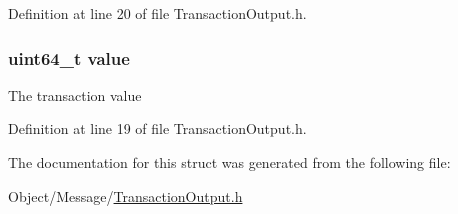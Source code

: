 Definition at line 20 of file TransactionOutput.h.

\hypertarget{struct_m_i_transaction_output_a4e630859cc0e2a22bd6acf39a6a8e218}{
\subsubsection[{value}]{\setlength{\rightskip}{0pt plus 5cm}uint64\_\-t {\bf value}}}
\label{struct_m_i_transaction_output_a4e630859cc0e2a22bd6acf39a6a8e218}
The transaction value 

Definition at line 19 of file TransactionOutput.h.



The documentation for this struct was generated from the following file:\begin{DoxyCompactItemize}
\item 
Object/Message/\hyperlink{_m_i_transaction_output_8h}{TransactionOutput.h}\end{DoxyCompactItemize}
